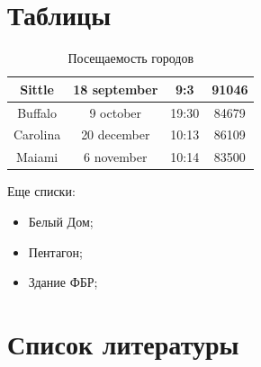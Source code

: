 \documentclass[a4paper,12pt]{article}
\begin{document}
	\section{Таблицы} 
	\label{s3}
	\begin{table}[h] 
		\label{t1}
		\begin{center}
			\begin{tabular}{|c|c|c|c|}
				\hline
				Sittle & 18 september & 9:3 & 91046\\
				\hline
				Buffalo & 9 october & 19:30 & 84679\\
				\hline
				Carolina & 20 december & 10:13 & 86109\\
				\hline
				Maiami & 6 november & 10:14 & 83500\\
				\hline
			\end{tabular}
		\end{center}
		\caption{Посещаемость городов}
	\end{table}
	\newpage
\begin{figure}[h]
	\centering
\end{figure}
	Еще списки:
	\begin{itemize}
		\item Белый Дом;
		\item Пентагон;
		\item Здание ФБР;
		\cite{posl}
	\end{itemize}
	\newpage
	
	\section{Список литературы}
	
\end{document}
